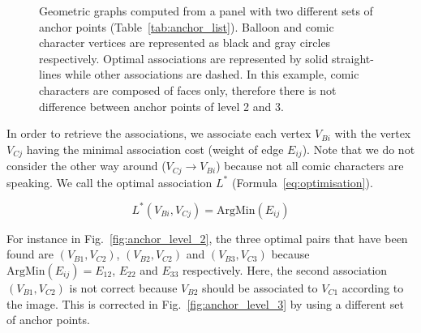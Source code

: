 \documentclass[conference]{IEEEtran}
\begin{document}
\begin{figure}[t] %
  \centering
    \hspace{0.1em}
    \caption{Geometric graphs computed from a panel with two different sets of anchor points (Table~\ref{tab:anchor_list}).
    Balloon and comic character vertices are represented as black and gray circles respectively.
    Optimal associations are represented by solid straight-lines while other associations are dashed.
    In this example, comic characters are composed of faces only, therefore there is not difference between anchor points of level 2 and 3.%
    }
  \label{fig:geometric_graph}
\end{figure}
In order to retrieve the associations, we associate each vertex $V_{Bi}$ with the vertex $V_{Cj}$ having the minimal association cost (weight of edge $E_{ij}$).
Note that we do not consider the other way around ($V_{Cj} \rightarrow V_{Bi}$) because not all comic characters are speaking.
We call the optimal association $L^*$ (Formula~\ref{eq:optimisation}).

\begin{equation}
\label{eq:optimisation}
  L^*(V_{Bi}, V_{Cj}) = \text{ArgMin}(E_{ij})
\end{equation}

For instance in Fig.~\ref{fig:anchor_level_2}, the three optimal pairs that have been found are $(V_{B1}, V_{C2})$, $(V_{B2}, V_{C2})$ and $(V_{B3}, V_{C3})$ because $\text{ArgMin}(E_{ij}) = E_{12}$, $E_{22}$  and $E_{33}$ respectively.
Here, the second association $(V_{B1}, V_{C2})$ is not correct because $V_{B2}$ should be associated to $V_{C1}$ according to the image.
This is corrected in Fig.~\ref{fig:anchor_level_3} by using a different set of anchor points.%
\end{document}
